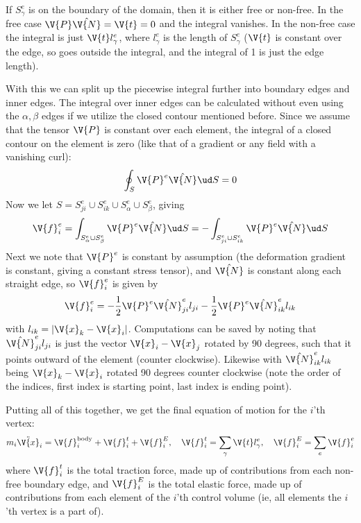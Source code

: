 \documentclass[sigconf]{acmart}
\begin{document}
If $ S^e_{\gamma} $ is on the boundary of the domain, then it is either free or non-free. In the free case $ \V{P}\hat{\V{N}} =\V{t}=0$ and the integral vanishes. In the non-free case the integral is just $ \V{t}l^e_{\gamma}$, where $ l^e_{\gamma} $ is the length of $ S^e_{\gamma} $ ($ \V{t} $ is constant over the edge, so goes outside the integral, and the integral of 1 is just the edge length).

With this we can split up the piecewise integral further into boundary edges and inner edges. The integral over inner edges can be calculated without even using the $ \alpha, \beta $ edges if we utilize the closed contour mentioned before. Since we assume that the tensor $ \V{P} $ is constant over each element, the integral of a closed contour on the element is zero (like that of a gradient or any field with a vanishing curl):
\begin{equation}\label{key}
	\oint_S \V{P}^e\hat{\V{N}} \ud S = 0
\end{equation}
Now we let $ S = S^e_{ji} \cup S^e_{ik} \cup S^e_{\alpha} \cup S^e_{\beta} $, giving
\begin{equation}\label{key}
	\V{f}^e_i = \int_{S^e_{\alpha} \cup S^e_{\beta}} \V{P}^e\hat{\V{N}} \ud S = -\int_{S^e_{ji} \cup S^e_{ik}} \V{P}^e\hat{\V{N}} \ud S
\end{equation}
Next we note that $ \V{P}^e $ is constant by assumption (the deformation gradient is constant, giving a constant stress tensor), and $ \hat{\V{N}} $ is constant along each straight edge, so $ \V{f}^e_i $ is given by
\begin{equation}\label{key}
\V{f}^e_i = -\frac{1}{2} \V{P}^e \hat{\V{N}}^e_{ji}l_{ji} - \frac{1}{2} \V{P}^e\hat{\V{N}}^e_{ik}l_{ik}
\end{equation}
with $ l_{ik} = |\V{x}_k - \V{x}_i|$. Computations can be saved by noting that $ \hat{\V{N}}^e_{ji} l_{ji} $ is just the vector $ \V{x}_i-\V{x}_j $ rotated by 90 degrees, such that it points outward of the element (counter clockwise). Likewise with $ \hat{\V{N}}^e_{ik} l_{ik} $ being $ \V{x}_k -\V{x}_i$ rotated 90 degrees counter clockwise (note the order of the indices, first index is starting point, last index is ending point).

Putting all of this together, we get the final equation of motion for the $ i $'th vertex:
\begin{equation}\label{key}
	m_i \ddot{\V{x}}_i = \V{f}_i^{\text{body}} + \V{f}_i^t +\V{f}^E_i, \quad \V{f}^t_i = \sum_{\gamma}   \V{t}l^e_{\gamma}, \quad \V{f}^E_i = \sum_e \V{f}^e_i
\end{equation}
where $ \V{f}^t_i $ is the total traction force, made up of contributions from each non-free boundary edge, and $ \V{f}^E_i $ is the total elastic force, made up of contributions from each element of the $ i $'th control volume (ie, all elements the $ i $'th vertex is a part of).
\end{document}
